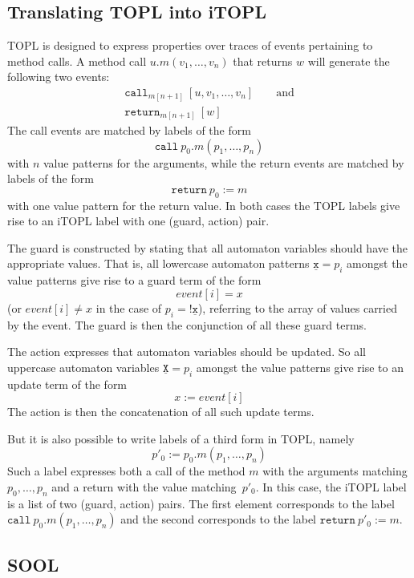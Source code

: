 \documentclass[preprint]{sigplanconf} %
\newcommand{\pattern}[1]{\ensuremath{\mathtt{\underline{#1}}}}
\theoremstyle{definition}
\theoremstyle{remark}
\begin{document}
\subsection{Translating TOPL into iTOPL}\label{sec:syntax.desugaring} %
TOPL is designed to express properties over traces of events
pertaining to method calls.
A method call $u.m(v_1, \ldots, v_n)$ that returns $w$ will generate the following two events:
\[
\begin{array}{l}
  \mathtt{call}_{m[n+1]}\ [u, v_1, \ldots, v_n] \qquad \mathrm{and} \\
  \mathtt{return}_{m[n+1]}\ [w]
\end{array}
\]
The call events are matched by labels of the form
\[
  \mathtt{call}\ p_0.m(p_1, \ldots, p_n)
\]
with $n$ value patterns for the arguments,
while the return events are matched by labels of the form
\[
  \mathtt{return}\ p_0:=m
\]
with one value pattern for the return value.
In both cases the TOPL labels give rise to an iTOPL label with one
(guard, action) pair.

The guard is constructed by stating that all automaton variables
should have the appropriate values. That is, all lowercase automaton
patterns $\pattern{x} = p_i$ amongst the value
patterns give rise to a guard term of the form
\[
event[i] = x
\]
(or $event[i] \neq x$ in the case of $p_i = {!\pattern{x}}$), referring to the
array of values carried by the event.
The guard is then the conjunction of all these guard terms.

The action expresses that automaton variables should be updated. So
all uppercase automaton variables $\pattern{X} = p_i$ amongst the value
patterns give rise to an update term of the form
\[
x := event[i]
\]
The action is then the concatenation of all such update terms.

But it is also possible to write labels of a third form in TOPL,
namely
\[
p'_0 := p_0.m(p_1, \ldots, p_n)
\]
Such a label expresses both a call of the method $m$ with the
arguments matching $p_0, \ldots, p_n$ and a return with the value
matching~$p'_0$.
In this case, the iTOPL label is a list of two (guard, action) pairs.
The first element corresponds to the label $\mathtt{call}\
p_0.m(p_1, \ldots, p_n)$ and the second corresponds to the label $\mathtt{return}\ p'_0:=m$.

\subsection{SOOL}\label{sec:syntax.sool} %
\end{document}
